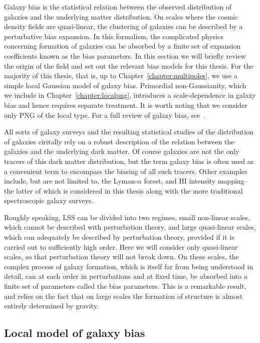 Galaxy bias is the statistical relation between the observed distribution of galaxies and the underlying matter distribution. On scales where the cosmic density fields are quasi-linear, the clustering of galaxies can be described by a perturbative bias expansion. In this formalism, the complicated physics concerning formation of galaxies can be absorbed by a finite set of expansion coefficients known as the bias parameters. In this section we will briefly review the origin of the field and set out the relevant bias models for this thesis. For the majority of this thesis, that is, up to Chapter~\ref{chapter:multipoles}, we use a simple local Gaussian model of galaxy bias. Primordial non-Gaussianity, which we include in Chapter~\ref{chapter:localpng}, introduces a scale-dependence in galaxy bias and hence requires separate treatment. It is worth noting that we consider only PNG of the local type. For a full review of galaxy bias, see~\cite{Desjacques:2016bnm}.

All sorts of galaxy surveys and the resulting statistical studies of the distribution of galaxies ciritally rely on a robust description of the relation between the galaxies and the underlying dark matter. Of course galaxies are not the only tracers of this dark matter distribution, but the term galaxy bias is often used as a convenient term to encompass the biasing of all such tracers. Other examples include, but are not limited to, the Lyman-$\alpha$ forest, and HI intensity mapping-- the latter of which is considered in this thesis along with the more traditional spectroscopic galaxy surveys. 

Roughly speaking, LSS can be divided into two regimes, small non-linear scales, which cannot be described with perturbation theory, and large quasi-linear scales, which can adequately be described by perturbation theory, provided if it is carried out to sufficiently high order. Here we will consider only quasi-linear scales, so that perturbation theory will not break down. On these scales, the complex process of galaxy formation, which is itself far from being understood in detail, can at each order in perturbations and at fixed time, be absorbed into a finite set of parameters called the bias parameters. This is a remarkable result, and relies on the fact that on large scales the formation of structure is almost entirely determined by gravity. 

\subsection{Local model of galaxy bias}

